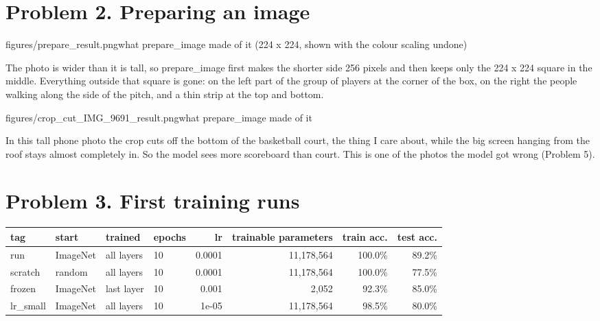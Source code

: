 \documentclass[11pt]{article}
\begin{document}

\section*{Problem 2. Preparing an image}

           {figures/prepare_result.png}{what prepare\_image made of it (224 x 224, shown with the colour scaling undone)}

The photo is wider than it is tall, so prepare\_image first makes the shorter side
256 pixels and then keeps only the 224 x 224 square in the middle. Everything
outside that square is gone: on the left part of the group of players at the
corner of the box, on the right the people walking along the side of the pitch,
and a thin strip at the top and bottom.

           {figures/crop_cut_IMG_9691_result.png}{what prepare\_image made of it}

In this tall phone photo the crop cuts off the bottom of the basketball court,
the thing I care about, while the big screen hanging from the roof stays almost
completely in. So the model sees more scoreboard than court. This is one of the
photos the model got wrong (Problem 5).

\section*{Problem 3. First training runs}

\begin{center}\footnotesize
\begin{tabular}{llllrrrr}
\toprule
tag & start & trained & epochs & lr & trainable parameters & train acc. & test acc. \\
\midrule
run & ImageNet & all layers & 10 & 0.0001 & 11,178,564 & 100.0\% & 89.2\% \\
scratch & random & all layers & 10 & 0.0001 & 11,178,564 & 100.0\% & 77.5\% \\
frozen & ImageNet & last layer & 10 & 0.001 & 2,052 & 92.3\% & 85.0\% \\
lr\_small & ImageNet & all layers & 10 & 1e-05 & 11,178,564 & 98.5\% & 80.0\% \\
\bottomrule
\end{tabular}
\end{center}
\end{document}
